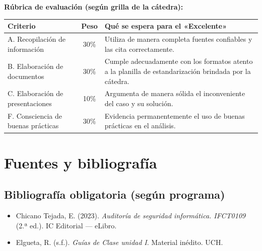 \documentclass[11pt,a4paper]{article}
\begin{document}
\textbf{Rúbrica de evaluación (según grilla de la cátedra):}
\begin{center}
\renewcommand{\arraystretch}{1.2}
\begin{tabularx}{\textwidth}{@{} l c X @{}}
\toprule
\textbf{Criterio} & \textbf{Peso} & \textbf{Qué se espera para el «Excelente»} \\
\midrule
A. Recopilación de información & 30\% & Utiliza de manera completa fuentes confiables y las cita correctamente. \\
B. Elaboración de documentos & 30\% & Cumple adecuadamente con los formatos atento a la planilla de estandarización brindada por la cátedra. \\
C. Elaboración de presentaciones & 10\% & Argumenta de manera sólida el inconveniente del caso y su solución. \\
F. Consciencia de buenas prácticas & 30\% & Evidencia permanentemente el uso de buenas prácticas en el análisis. \\
\bottomrule
\end{tabularx}
\end{center}

\section{Fuentes y bibliografía}

\subsection{Bibliografía obligatoria (según programa)}
\begin{itemize}[leftmargin=*]
  \item Chicano Tejada, E. (2023). \textit{Auditoría de seguridad informática. IFCT0109} (2.ª ed.). IC Editorial --- eLibro.
  \item Elgueta, R. (s.f.). \textit{Guías de Clase unidad I}. Material inédito. UCH.
\end{itemize}
\end{document}
